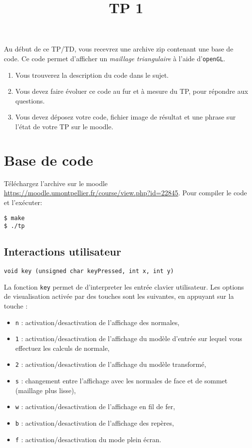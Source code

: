 \documentclass[a4paper,10pt]{tp_um}
\title{\Large \sffamily\bfseries TP 1}
\newcommand\code[1]{\texttt{#1}}
\begin{document}
\maketitle

\bigskip
\bigskip
\bigskip

Au d\'ebut de ce TP/TD, vous recevrez une archive zip contenant une base de code.
Ce code permet d'afficher un \emph{maillage triangulaire} \`a l'aide d'\texttt{openGL}.
\begin{enumerate}
 \item Vous trouverez la description du code dans le sujet.
 \item Vous devez faire \'evoluer ce code au fur et \`a mesure du TP, pour r\'epondre aux questions.
 \item Vous devez déposez votre code, fichier image de résultat et une phrase sur l'état de votre TP sur le moodle.
\end{enumerate}


\section{Base de code}

T\'el\'echargez l'archive sur le moodle \url{https://moodle.umontpellier.fr/course/view.php?id=22845}. Pour compiler le code et l'exécuter: 
\begin{verbatim}
$ make
$ ./tp
\end{verbatim}

\subsection{Interactions utilisateur}
\begin{verbatim}
void key (unsigned char keyPressed, int x, int y)
\end{verbatim}
La fonction \code{key} permet de d'interpreter les entrée clavier utilisateur.
Les options de visualisation activée par des touches sont les suivantes, en appuyant sur la touche :
\begin{itemize}
 \item \code{n} : activation/desactivation de l'affichage des normales,
 \item \code{1} : activation/desactivation de l'affichage du modèle d'entrée sur lequel vous effectuez les calculs de normale,
 \item \code{2} : activation/desactivation de l'affichage du modèle transformé,
 \item \code{s} : changement entre l'affichage avec les normales de face et de sommet (maillage plus lisse),
 \item \code{w} : activation/desactivation de l'affichage en fil de fer,
 \item \code{b} : activation/desactivation de l'affichage des repères,
 \item \code{f} : activation/desactivation du mode plein écran.
\end{itemize}
\end{document}
